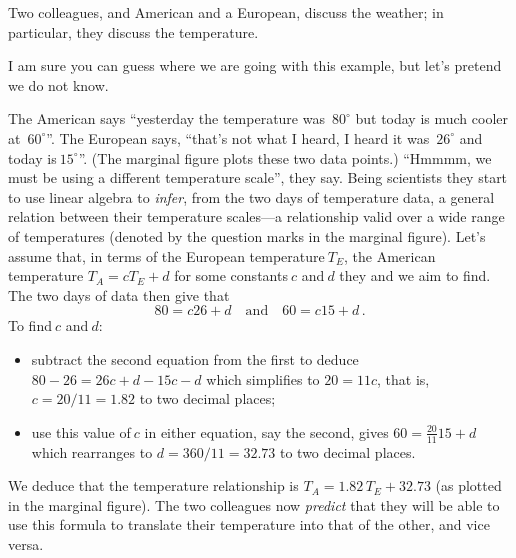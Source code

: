 \begin{example} \label{eg:infertemp}
Two colleagues, and American and a European, discuss the weather; in particular, they discuss the temperature.
\begin{aside}
I am sure you can guess where we are going with this example, but let's pretend we do not know.
\end{aside}
The American says ``yesterday the temperature was~\(80^\circ\) but today is much cooler at~\(60^\circ\)''.
The European says, ``that's not what I heard, I heard it was~\(26^\circ\) and today is\(~15^\circ\)''.
(The marginal figure plots these two data points.)
``Hmmmm, we must be using a different temperature scale'', they say.
Being scientists they start to use linear algebra to \emph{infer}, from the two days of temperature data, a general relation between their temperature scales---a relationship valid over a wide range of temperatures (denoted by the question marks in the marginal figure).
Let's assume that, in terms of the European temperature\(~T_E\), the American temperature \(T_A=cT_E+d\) for some constants\(~c\) and\(~d\) they and we aim to find.
The two days of data then give that
\begin{equation*}
80=c26+d\quad\text{and}\quad 60=c15+d\,.
\end{equation*}
To find\(~c\) and\(~d\):
\begin{itemize}
\item subtract the second equation from the first to deduce \(80-26=26c+d-15c-d\) which simplifies to \(20=11c\), that is, \(c=20/11=1.82\) to two decimal places;
\item use this value of\(~c\) in either equation, say the second, gives \(60=\frac{20}{11}15+d\) which rearranges to \(d=360/11=32.73\)  to two decimal places.
\end{itemize}
We deduce that the temperature relationship is \(T_A=1.82\,T_E+32.73\) (as plotted in the marginal figure).
The two colleagues now \emph{predict} that they will be able to use this formula to translate their temperature into that of the other, and vice versa.


\end{example}
